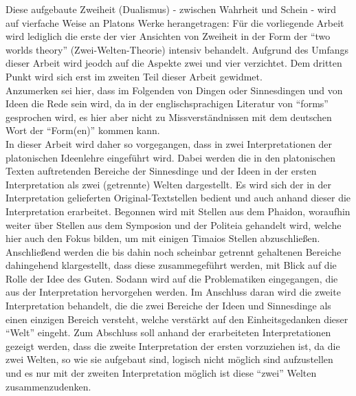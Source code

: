 Diese aufgebaute Zweiheit (Dualismus) - zwischen Wahrheit und Schein - wird auf vierfache Weise an Platons Werke herangetragen:
Für die vorliegende Arbeit wird lediglich die erste der vier Ansichten von Zweiheit in der Form der \enquote{two worlds theory} (Zwei-Welten-Theorie) intensiv behandelt. 
Aufgrund des Umfangs dieser Arbeit wird jeodch auf die Aspekte zwei und vier verzichtet. Dem dritten Punkt wird sich erst im zweiten Teil dieser Arbeit gewidmet.\\
Anzumerken sei hier, dass im Folgenden von Dingen oder Sinnesdingen und von Ideen die Rede sein wird, da in der englischsprachigen Literatur von \enquote{forms} gesprochen wird, es hier aber nicht zu Missverständnissen mit dem deutschen Wort der \enquote{Form(en)} kommen kann.\\
In dieser Arbeit wird daher so vorgegangen, dass in zwei Interpretationen der platonischen Ideenlehre eingeführt wird. Dabei werden die in den platonischen Texten auftretenden Bereiche der Sinnesdinge und der Ideen in der ersten Interpretation als zwei (getrennte) Welten dargestellt. Es wird sich der in der Interpretation gelieferten Original-Textstellen bedient und auch anhand dieser die Interpretation erarbeitet. Begonnen wird mit Stellen aus dem Phaidon, woraufhin weiter über Stellen aus dem Symposion und der Politeia gehandelt wird, welche hier auch den Fokus bilden, um mit einigen Timaios Stellen abzuschließen. Anschließend werden die bis dahin noch scheinbar getrennt gehaltenen Bereiche dahingehend klargestellt, dass diese zusammegeführt werden, mit Blick auf die Rolle der Idee des Guten. Sodann wird auf die Problematiken eingegangen, die aus der Interpretation hervorgehen werden. Im Anschluss daran wird die zweite Interpretation behandelt, die die zwei Bereiche der Ideen und Sinnesdinge als einen einzigen Bereich versteht, welche verstärkt auf den Einheitsgedanken dieser \enquote{Welt} eingeht. Zum Abschluss soll anhand der erarbeiteten Interpretationen gezeigt werden, dass die zweite Interpretation der ersten vorzuziehen ist, da die zwei Welten, so wie sie aufgebaut sind, logisch nicht möglich sind aufzustellen und es nur mit der zweiten Interpretation möglich ist diese \enquote{zwei} Welten zusammenzudenken.\\
